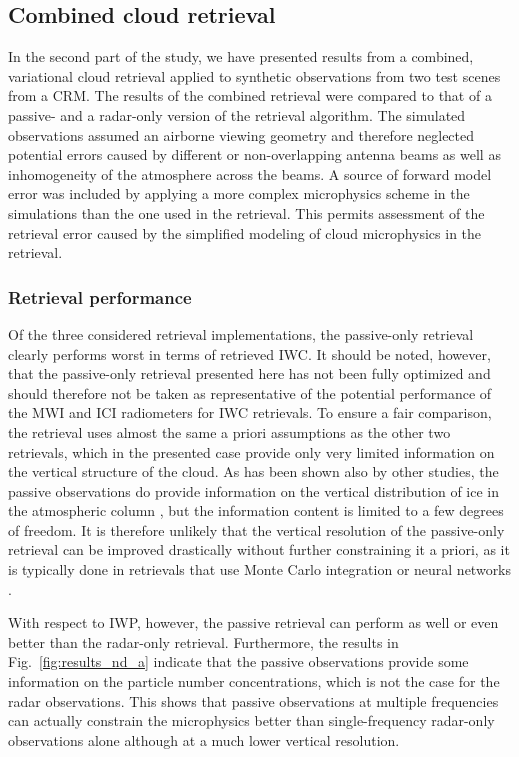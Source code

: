\documentclass[journal abbreviation, manuscript]{copernicus}
\begin{document}
\subsection{Combined cloud retrieval}

In the second part of the study, we have presented results from a combined,
variational cloud retrieval applied to synthetic observations from two test
scenes from a CRM. The results of the combined retrieval were compared to that
of a passive- and a radar-only version of the retrieval algorithm. The simulated
observations assumed an airborne viewing geometry and therefore neglected
potential errors caused by different or non-overlapping antenna beams as well as
inhomogeneity of the atmosphere across the beams. A source of forward model
error was included by applying a more complex microphysics scheme in the
simulations than the one used in the retrieval. This permits assessment of the
retrieval error caused by the simplified modeling of cloud microphysics in the
retrieval.

\subsubsection{Retrieval performance}

Of the three considered retrieval implementations, the passive-only retrieval
clearly performs worst in terms of retrieved IWC. It should be noted, however,
that the passive-only retrieval presented here has not been fully optimized and
should therefore not be taken as representative of the potential performance of
the MWI and ICI radiometers for IWC retrievals. To ensure a fair comparison, the
retrieval uses almost the same a priori assumptions as the other two retrievals,
which in the presented case provide only very limited information on the
vertical structure of the cloud. As has been shown also by other studies, the
passive observations do provide information on the vertical distribution of ice
in the atmospheric column \citep{wang17, grutzun18}, but the information content
is limited to a few degrees of freedom. It is therefore unlikely that the
vertical resolution of the passive-only retrieval can be improved drastically
without further constraining it a priori, as it is typically done in retrievals
that use Monte Carlo integration or neural networks \citep{pfreundschuh18}.

With respect to IWP, however, the passive retrieval can perform as well or even
better than the radar-only retrieval. Furthermore, the results in
Fig.~\ref{fig:results_nd_a} indicate that the passive observations provide some
information on the particle number concentrations, which is not the case for the
radar observations. This shows that passive observations at multiple frequencies
can actually constrain the microphysics better than single-frequency radar-only
observations alone although at a much lower vertical resolution.
\end{document}
